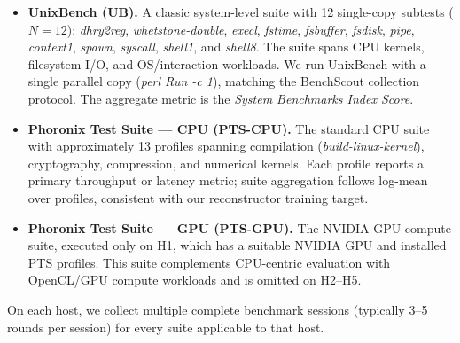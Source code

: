 \documentclass[sigplan,10pt]{acmart}
\newcommand{\ptscpu}{PTS-CPU}
\newcommand{\ptsgpu}{PTS-GPU}
\newcommand{\id}[1]{{\itshape #1}}
\newcommand{\appname}{BenchScout}
\begin{document}
\begin{itemize}
    \item \textbf{UnixBench (UB).} A classic system-level suite with 12 single-copy subtests (\(N=12\)): \id{dhry2reg}, \id{whetstone-double}, \id{execl}, \id{fstime}, \id{fsbuffer}, \id{fsdisk}, \id{pipe}, \id{context1}, \id{spawn}, \id{syscall}, \id{shell1}, and \id{shell8}.
    The suite spans CPU kernels, filesystem I/O, and OS/interaction workloads.
    We run UnixBench with a single parallel copy (\id{perl Run -c 1}), matching the \appname{} collection protocol.
    The aggregate metric is the \emph{System Benchmarks Index Score}.

    \item \textbf{Phoronix Test Suite --- CPU (\ptscpu).} The standard CPU suite with approximately 13 profiles spanning compilation (\id{build-linux-kernel}), cryptography, compression, and numerical kernels.
    Each profile reports a primary throughput or latency metric; suite aggregation follows log-mean over profiles, consistent with our reconstructor training target.

    \item \textbf{Phoronix Test Suite --- GPU (\ptsgpu).} The NVIDIA GPU compute suite, executed only on H1, which has a suitable NVIDIA GPU and installed PTS profiles.
    This suite complements CPU-centric evaluation with OpenCL/GPU compute workloads and is omitted on H2--H5.
\end{itemize}

On each host, we collect multiple complete benchmark sessions (typically 3--5 rounds per session) for every suite applicable to that host.
\end{document}
